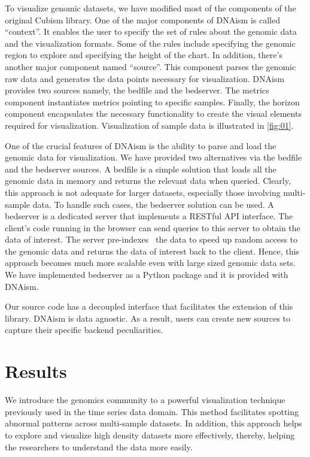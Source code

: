 \documentclass{bioinfo}
\begin{document}
To visualize genomic datasets, we have modified most of the components of the
original Cubism library. One of the major components of DNAism is called
“context”. It enables the user to specify the set of rules about the genomic
data and the visualization formats. Some of the rules include specifying the
genomic region to explore and specifying the height of the chart. In addition,
there’s another major component named “source”. This component parses the
genomic raw data and generates the data points necessary for visualization.
DNAism provides two sources namely, the bedfile and the bedserver. The metrics
component instantiates metrics pointing to specific samples. Finally, the
horizon component encapsulates the necessary functionality to create the
visual elements required for visualization. Visualization of sample data is
illustrated in \ref{fig:01}.

One of the crucial features of DNAism is the ability to parse and load the
genomic data for visualization. We have provided two alternatives via the
bedfile and the bedserver sources. A bedfile is a simple solution that loads
all the genomic data in memory and returns the relevant data when queried.
Clearly, this approach is not adequate for larger datasets, especially those
involving multi-sample data. To handle such cases, the bedserver solution can
be used. A bedserver is a dedicated server that implements a RESTful API
interface. The client's code running in the browser can send queries to this
server to obtain the data of interest. The server pre-indexes~\citep{tabix-li}
the data to speed up random access to the genomic data and returns the data of
interest back to the client. Hence, this approach becomes much more scalable
even with large sized genomic data sets. We have implemented bedserver as a
Python package and it is provided with DNAism.

Our source code has a decoupled interface that facilitates the extension of
this library. DNAism is data agnostic. As a result, users can create new
sources to capture their specific backend peculiarities.


\section{Results}

We introduce the genomics community to a powerful visualization technique
previously used in the time series data domain. This method facilitates
spotting abnormal patterns across multi-sample datasets.  In addition, this
approach helps to explore and visualize high density datasets more effectively,
thereby, helping the researchers to understand the data more easily.
\end{document}
